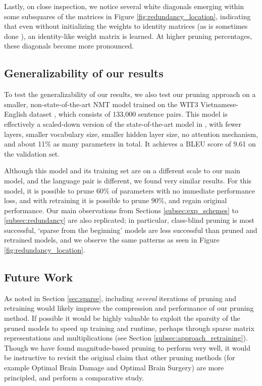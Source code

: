 Lastly, on close inspection, we notice several white diagonals emerging within
some subsquares of the matrices in Figure \ref{fig:redundancy_location},
indicating that even without initializing the weights to identity matrices
(as is sometimes done \cite{le2015simple}),
an identity-like weight matrix is learned. At higher pruning percentages, these diagonals become more pronounced.

\subsection{Generalizability of our results}
To test the generalizability of our results, we also test our pruning approach
on a smaller, non-state-of-the-art NMT model trained on the WIT3 Vietnamese-English 
dataset \cite{cettoloEtAl:EAMT2012}, which consists of 133,000 sentence pairs.
This model is effectively a scaled-down version of the state-of-the-art model in \cite{luong2015effective},
with fewer layers, smaller vocabulary size, smaller hidden layer size, no attention mechanism,
and about 11\% as many parameters in total.
It achieves a BLEU score of 9.61 on the validation set.

Although this model and its training set are on a different scale to our main model, 
and the language pair is different, 
we found very similar results. 
For this model, it is possible to prune 60\% of parameters with no immediate performance loss,
and with retraining it is possible to prune 90\%, and regain original performance.
Our main observations from Sections \ref{subsec:exp_schemes} to \ref{subsec:redundancy}
are also replicated; in particular, class-blind pruning is most successful,
`sparse from the beginning' models are less successful than pruned and retrained models,
and we observe the same patterns as seen in Figure \ref{fig:redundancy_location}.



\subsection{Future Work}
As noted in Section \ref{sec:sparse}, including \emph{several} iterations of pruning and retraining would likely improve the compression and performance of our pruning method.
If possible it would be highly valuable to exploit the sparsity of the pruned models to speed up training and runtime, perhaps through sparse matrix representations and multiplications (see Section \ref{subsec:approach_retraining}).
Though we have found magnitude-based pruning to perform very well, it would be instructive to revisit the original claim that other pruning methods (for example Optimal Brain Damage and Optimal Brain Surgery) are more principled, and perform a comparative study.

